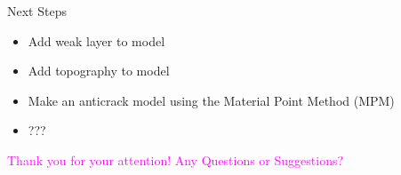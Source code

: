 \documentclass[11pt,aspectratio=169]{beamer}
\begin{document}
\begin{frame}{Next Steps}
    \begin{itemize}
        \item Add weak layer to model
        \item Add topography to model
        \item Make an anticrack model using the Material Point Method (MPM)
        \item ???
    \end{itemize}
    
\end{frame}

\begin{frame}
    \centering
   \textcolor{magenta}{ \large{Thank you for your attention! Any Questions or Suggestions?}}
\end{frame}




	
	
	
	




	
		
	
\end{document}
